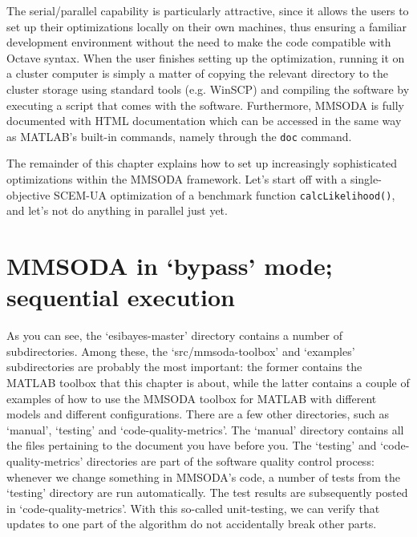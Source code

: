 The serial/parallel capability is particularly attractive, since it allows the users to set up their optimizations locally on their own machines, thus ensuring a familiar development environment without the need to make the code compatible with Octave syntax. When the user finishes setting up the optimization, running it on a cluster computer is simply a matter of copying the relevant directory to the cluster storage using standard tools (e.g. WinSCP) and compiling the software by executing a script that comes with the software. Furthermore, MMSODA is fully documented with HTML documentation which can be accessed in the same way as MATLAB's built-in commands, namely through the \texttt{doc} command.

The remainder of this chapter explains how to set up increasingly sophisticated optimizations within the MMSODA framework. Let's start off with a single-objective SCEM-UA optimization of a benchmark function \texttt{calcLikelihood()}, and let's not do anything in parallel just yet.

\section{MMSODA in `bypass' mode; sequential execution}


As you can see, the `esibayes-master' directory contains a number of subdirectories. Among these, the `src/mmsoda-toolbox' and `examples' subdirectories are probably the most important: the former contains the MATLAB toolbox that this chapter is about, while the latter contains a couple of examples of how to use the MMSODA toolbox for MATLAB with different models and different configurations. There are a few other directories, such as `manual', `testing' and `code-quality-metrics'. The `manual' directory contains all the files pertaining to the document you have before you. The `testing' and `code-quality-metrics' directories are part of the software quality control process: whenever we change something in MMSODA's code, a number of tests from the `testing' directory are run automatically. The test results are subsequently posted in `code-quality-metrics'. With this so-called unit-testing, we can verify that updates to one part of the algorithm do not accidentally break other parts.

